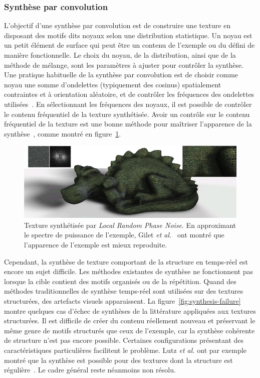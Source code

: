 \subsubsection{Synthèse par convolution}

L'objectif d'une synthèse par convolution est de construire une texture en disposant des motifs dits noyaux selon une distribution statistique. Un noyau est un petit élément de surface qui peut être un contenu de l'exemple ou du défini de manière fonctionnelle. Le choix du noyau, de la distribution, ainsi que de la méthode de mélange, sont les paramètres à ajuster pour contrôler la synthèse. Une pratique habituelle de la synthèse par convolution est de choisir comme noyau une somme d'ondelettes (typiquement des cosinus) spatialement contraintes et à orientation aléatoire, et de contrôler les fréquences des ondelettes utilisées~\cite{tricard_procedural_2019}. En sélectionnant les fréquences des noyaux, il est possible de contrôler le contenu fréquentiel de la texture synthétisée. Avoir un contrôle sur le contenu fréquentiel de la texture est une bonne méthode pour maîtriser l'apparence de la synthèse~\cite{gilet_local_2014}, comme montré en figure~\ref{fig:lrpn}.

\bigskip

\begin{figure}
    \centering
    \includegraphics[width=.8\textwidth]{contenu/resources/images/lrpn}
    \caption[Maîtriser le contenu fréquentiel permet de contrôler l'apparence d'une synthèse]{Texture synthétisée par \textit{Local Random Phase Noise}. En approximant le spectre de puissance de l'exemple, Gilet \textit{et al.}~\cite{gilet_local_2014} ont montré que l'apparence de l'exemple est mieux reproduite.}
    \label{fig:lrpn}
\end{figure}

Cependant, la synthèse de texture comportant de la structure en temps-réel est encore un sujet difficile. Les méthodes existantes de synthèse ne fonctionnent pas lorsque la cible contient des motifs organisés ou de la répétition. Quand des méthodes traditionnelles de synthèse temps-réel sont utilisées sur des textures structurées, des artefacts visuels apparaissent. La figure~\ref{fig:synthesis-failure} montre quelques cas d'échec de synthèses de la littérature appliquées aux textures structurées. Il est difficile de créer du contenu réellement nouveau et préservant le même genre de motifs structurés que ceux de l'exemple, car la synthèse cohérente de structure n'est pas encore possible. Certaines configurations présentant des caractéristiques particulières facilitent le problème. Lutz \textit{et al.} ont par exemple montré que la synthèse est possible pour des textures dont la structure est régulière~\cite{lutz_cyclostationary-gaussian_2021}. Le cadre général reste néanmoins non résolu.

